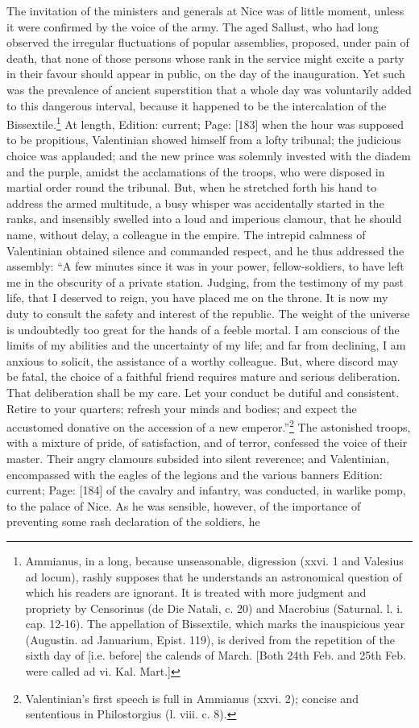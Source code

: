 The invitation of the ministers and generals at Nice was of little moment, unless it were confirmed by the voice of the army. The aged Sallust, who had long observed the irregular fluctuations of popular assemblies, proposed, under pain of death, that none of those persons whose rank in the service might excite a party in their favour should appear in public, on the day of the inauguration. Yet such was the prevalence of ancient superstition that a whole day was voluntarily added to this dangerous interval, because it happened to be the intercalation of the Bissextile.\footnote{Ammianus, in a long, because unseasonable, digression (xxvi. 1 and Valesius ad locum), rashly supposes that he understands an astronomical question of which his readers are ignorant. It is treated with more judgment and propriety by Censorinus (de Die Natali, c. 20) and Macrobius (Saturnal. l. i. cap. 12-16). The appellation of Bissextile, which marks the inauspicious year (Augustin. ad Januarium, Epist. 119), is derived from the repetition of the sixth day of [i.e. before] the calends of March. [Both 24th Feb. and 25th Feb. were called ad vi. Kal. Mart.]} At length, Edition: current; Page: [183] when the hour was supposed to be propitious, Valentinian showed himself from a lofty tribunal; the judicious choice was applauded; and the new prince was solemnly invested with the diadem and the purple, amidst the acclamations of the troops, who were disposed in martial order round the tribunal. But, when he stretched forth his hand to address the armed multitude, a busy whisper was accidentally started in the ranks, and insensibly swelled into a loud and imperious clamour, that he should name, without delay, a colleague in the empire. The intrepid calmness of Valentinian obtained silence and commanded respect, and he thus addressed the assembly: \texthebrew{“}A few minutes since it was in your power, fellow-soldiers, to have left me in the obscurity of a private station. Judging, from the testimony of my past life, that I deserved to reign, you have placed me on the throne. It is now my duty to consult the safety and interest of the republic. The weight of the universe is undoubtedly too great for the hands of a feeble mortal. I am conscious of the limits of my abilities and the uncertainty of my life; and far from declining, I am anxious to solicit, the assistance of a worthy colleague. But, where discord may be fatal, the choice of a faithful friend requires mature and serious deliberation. That deliberation shall be my care. Let your conduct be dutiful and consistent. Retire to your quarters; refresh your minds and bodies; and expect the accustomed donative on the accession of a new emperor.\texthebrew{}”\footnote{Valentinian\texthebrew{}’s first speech is full in Ammianus (xxvi. 2); concise and sententious in Philostorgius (l. viii. c. 8).} The astonished troops, with a mixture of pride, of satisfaction, and of terror, confessed the voice of their master. Their angry clamours subsided into silent reverence; and Valentinian, encompassed with the eagles of the legions and the various banners Edition: current; Page: [184] of the cavalry and infantry, was conducted, in warlike pomp, to the palace of Nice. As he was sensible, however, of the importance of preventing some rash declaration of the soldiers, he 